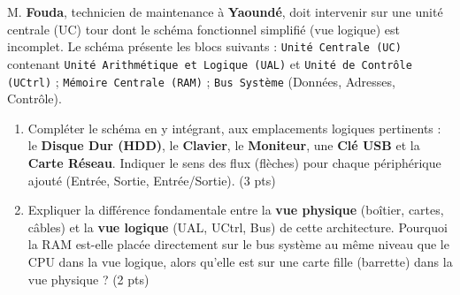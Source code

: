 \documentclass[11pt]{article}
\begin{document}
\begin{exercice}
M. \textbf{Fouda}, technicien de maintenance à \textbf{Yaoundé}, doit intervenir sur une unité centrale (UC) tour dont le schéma fonctionnel simplifié (vue logique) est incomplet. Le schéma présente les blocs suivants : \texttt{Unité Centrale (UC)} contenant \texttt{Unité Arithmétique et Logique (UAL)} et \texttt{Unité de Contrôle (UCtrl)} ; \texttt{Mémoire Centrale (RAM)} ; \texttt{Bus Système} (Données, Adresses, Contrôle).
\begin{enumerate}
    \item Compléter le schéma en y intégrant, aux emplacements logiques pertinents : le \textbf{Disque Dur (HDD)}, le \textbf{Clavier}, le \textbf{Moniteur}, une \textbf{Clé USB} et la \textbf{Carte Réseau}. Indiquer le sens des flux (flèches) pour chaque périphérique ajouté (Entrée, Sortie, Entrée/Sortie). (3 pts)
    \item Expliquer la différence fondamentale entre la \textbf{vue physique} (boîtier, cartes, câbles) et la \textbf{vue logique} (UAL, UCtrl, Bus) de cette architecture. Pourquoi la RAM est-elle placée directement sur le bus système au même niveau que le CPU dans la vue logique, alors qu'elle est sur une carte fille (barrette) dans la vue physique ? (2 pts)
\end{enumerate}
\end{exercice}
\end{document}
